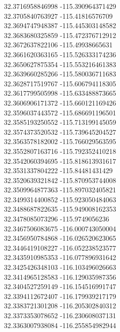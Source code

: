 {32.3716958846998	-115.390964371429\\
32.3705840763927	-115.41816576709\\
32.3694747948387	-115.445303148582\\
32.3683680325859	-115.472376712912\\
32.3672637822106	-115.49938665631\\
32.3661620363165	-115.526333174236\\
32.3650627875354	-115.553216461383\\
32.3639660285266	-115.580036711683\\
32.3628717519767	-115.606794118305\\
32.3617799505998	-115.633488873665\\
32.3606906171372	-115.660121169426\\
32.3596037443572	-115.686691196501\\
32.3585193250552	-115.713199145059\\
32.3574373520532	-115.739645204527\\
32.3563578182002	-115.766029563595\\
32.3552807163716	-115.792352410218\\
32.3542060394695	-115.818613931617\\
32.3531337804222	-115.84481431429\\
32.3520639321842	-115.870953744008\\
32.3509964877363	-115.897032405821\\
32.3499314400852	-115.923050484063\\
32.3488687822635	-115.949008162353\\
32.3478085073296	-115.9749056236\\
32.3467506083675	-116.000743050004\\
32.3456950784868	-116.026520623065\\
32.3446419108227	-116.052238523577\\
32.3435910985353	-116.077896931642\\
32.3425426348103	-116.103496026663\\
32.3414965128583	-116.129035987356\\
32.3404527259149	-116.154516991747\\
32.3394112672407	-116.179939217179\\
32.3383721301208	-116.205302840312\\
32.3373353078652	-116.230608037131\\
32.3363007938084	-116.255854982944\\
}
